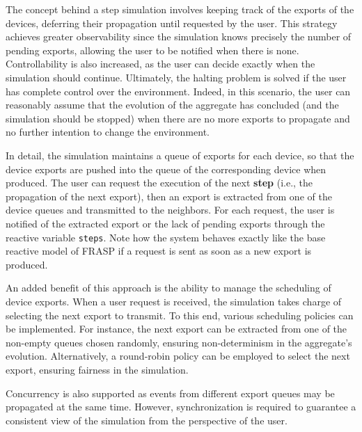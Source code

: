 The concept behind a step simulation involves keeping track of the exports of
the devices, deferring their propagation until requested by the user. This
strategy achieves greater observability since the simulation knows precisely
the number of pending exports, allowing the user to be notified when there is
none. Controllability is also increased, as the user can decide exactly when
the simulation should continue. Ultimately, the halting problem is solved if
the user has complete control over the environment. Indeed, in this scenario,
the user can reasonably assume that the evolution of the aggregate has
concluded (and the simulation should be stopped) when there are no more exports
to propagate and no further intention to change the environment.

In detail, the simulation maintains a queue of exports for each device, so that
the device exports are pushed into the queue of the corresponding device when
produced. The user can request the execution of the next \textbf{step} (i.e.,
the propagation of the next export), then an export is extracted from one of
the device queues and transmitted to the neighbors. For each request, the user
is notified of the extracted export or the lack of pending exports through the
reactive variable \texttt{steps}. Note how the system behaves exactly like the
base reactive model of FRASP if a request is sent as soon as a new export is
produced.

An added benefit of this approach is the ability to manage the scheduling of
device exports. When a user request is received, the simulation takes charge of
selecting the next export to transmit. To this end, various scheduling policies
can be implemented. For instance, the next export can be extracted from one of
the non-empty queues chosen randomly, ensuring non-determinism in the
aggregate's evolution. Alternatively, a round-robin policy can be employed to
select the next export, ensuring fairness in the simulation.

Concurrency is also supported as events from different export queues may be
propagated at the same time. However, synchronization is required to guarantee
a consistent view of the simulation from the perspective of the user.
